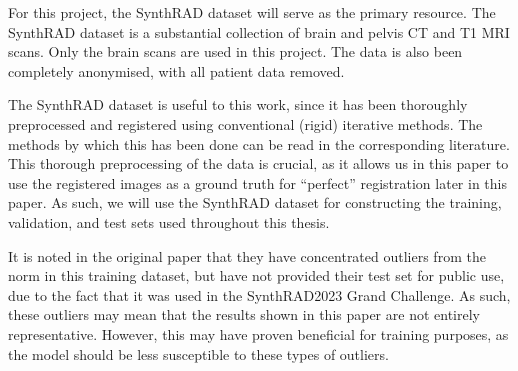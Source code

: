 For this project, the SynthRAD dataset\cite{synthradData} will serve as the primary resource. The SynthRAD dataset is a substantial collection of brain and pelvis CT and T1 MRI scans. Only the brain scans are used in this project. The data is also been completely anonymised, with all patient data removed.

The SynthRAD dataset is useful to this work, since it has been thoroughly preprocessed and registered using conventional (rigid) iterative methods. The methods by which this has been done can be read in the corresponding literature. This thorough preprocessing of the data is crucial, as it allows us in this paper to use the registered images as a ground truth for ``perfect'' registration later in this paper. As such, we will use the SynthRAD dataset for constructing the training, validation, and test sets used throughout this thesis.

It is noted in the original paper\cite{synthradData} that they have concentrated outliers from the norm in this training dataset, but have not provided their test set for public use, due to the fact that it was used in the SynthRAD2023 Grand Challenge. As such, these outliers may mean that the results shown in this paper are not entirely representative. However, this may have proven beneficial for training purposes, as the model should be less susceptible to these types of outliers.
